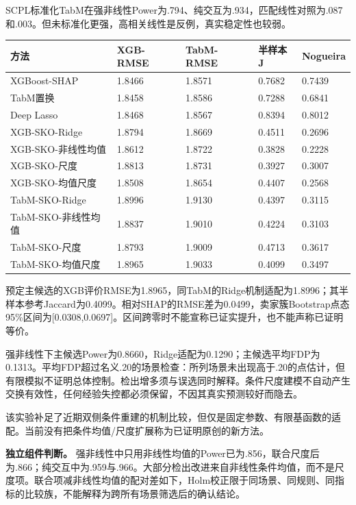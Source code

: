 \documentclass[UTF8,11pt,a4paper]{ctexart}
\begin{document}
SCPL标准化TabM在强非线性Power为.794、纯交互为.934，匹配线性对照为.087和.003。但未标准化更强，高相关线性是反例，真实稳定性也较弱。

{\def\LTcaptype{none} %
{
\footnotesize
\begin{longtable}[]{@{}lllll@{}}
\toprule\noalign{}
方法 & XGB-RMSE & TabM-RMSE & 半样本J & Nogueira \\
\midrule\noalign{}
\endhead
\bottomrule\noalign{}
\endlastfoot
XGBoost-SHAP & 1.8466 & 1.8571 & 0.7682 & 0.7439 \\
TabM置换 & 1.8458 & 1.8586 & 0.7288 & 0.6841 \\
Deep Lasso & 1.8468 & 1.8567 & 0.8394 & 0.8012 \\
XGB-SKO-Ridge & 1.8794 & 1.8669 & 0.4511 & 0.2696 \\
XGB-SKO-非线性均值 & 1.8612 & 1.8722 & 0.3828 & 0.2228 \\
XGB-SKO-尺度 & 1.8813 & 1.8731 & 0.3927 & 0.3007 \\
XGB-SKO-均值尺度 & 1.8508 & 1.8654 & 0.4407 & 0.2568 \\
TabM-SKO-Ridge & 1.8996 & 1.9130 & 0.4397 & 0.3115 \\
TabM-SKO-非线性均值 & 1.8837 & 1.9010 & 0.4224 & 0.3103 \\
TabM-SKO-尺度 & 1.8793 & 1.9009 & 0.4713 & 0.3617 \\
TabM-SKO-均值尺度 & 1.8965 & 1.9033 & 0.4099 & 0.3497 \\
\end{longtable}
}
}

预定主候选的XGB评价RMSE为1.8965，同TabM的Ridge机制适配为1.8996；其半样本参考Jaccard为0.4099。相对SHAP的RMSE差为0.0499，卖家簇Bootstrap点态95\%区间为{[}0.0308,0.0697{]}。区间跨零时不能宣称已证实提升，也不能声称已证明等价。

强非线性下主候选Power为0.8660，Ridge适配为0.1290；主候选平均FDP为0.1313。平均FDP超过名义.20的场景检查：所列场景未出现高于.20的点估计，但有限模拟不证明总体控制。检出增多须与误选同时解释。条件尺度建模不自动产生交换有效性，任何经验失控都必须保留，不因其真实预测较好而隐去。

该实验补足了近期双侧条件重建的机制比较，但仅是固定参数、有限基函数的适配。当前没有把条件均值/尺度扩展称为已证明原创的新方法。

\textbf{独立组件判断。} 强非线性中只用非线性均值的Power已为.856，联合尺度后为.866；纯交互中为.959与.966。大部分检出改进来自非线性条件均值，而不是尺度项。联合项减非线性均值的配对差如下，Holm校正限于同场景、同规则、同指标的比较族，不能解释为跨所有场景筛选后的确认结论。
\end{document}
